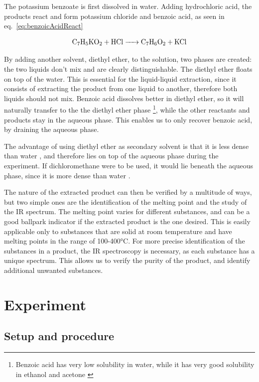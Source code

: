 \documentclass{article}
\begin{document}
The potassium benzoate is first dissolved in water. Adding hydrochloric acid, the products react and form potassium chloride and benzoic acid, as seen in eq.~\ref{eq:benzoicAcidReact} \cite{labguide} \cite{potassiumBenzoate} 

\begin{equation}
    \ce{C7H5KO2 + HCl -> C7H6O2 + KCl}
    \label{eq:benzoicAcidReact}
\end{equation}

By adding another solvent, diethyl ether, to the solution, two phases are created: the two liquids don't mix and are clearly distinguishable. The diethyl ether floats on top of the water. This is essential for the liquid-liquid extraction, since it consists of extracting the product from one liquid to another, therefore both liquids should not mix. Benzoic acid dissolves better in diethyl ether, so it will naturally transfer to the the diethyl ether phase \footnote{Benzoic acid has very low solubility in water, while it has very good solubility in ethanol and acetone \cite{benzoicAcid}}, while the other reactants and products stay in the aqueous phase. This enables us to only recover benzoic acid, by draining the aqueous phase. 

The advantage of using diethyl ether as secondary solvent is that it is less dense than water \cite{diethylEther}\cite{water}, and therefore lies on top of the aqueous phase during the experiment. If dichloromethane were to be used, it would lie beneath the aqueous phase, since it is more dense than water \cite{dichloromethane}.

The nature of the extracted product can then be verified by a multitude of ways, but two simple ones are the identification of the melting point and the study of the IR spectrum. The melting point varies for different substances, and can be a good ballpark indicator if the extracted product is the one desired. This is easily applicable only to substances that are solid at room temperature and have melting points in the range of 100-400°C. For more precise identification of the substances in a product, the IR spectroscopy is necessary, as each substance has a unique spectrum. This allows us to verify the purity of the product, and identify additional unwanted substances.

\section{Experiment}

\subsection{Setup and procedure}
\end{document}
